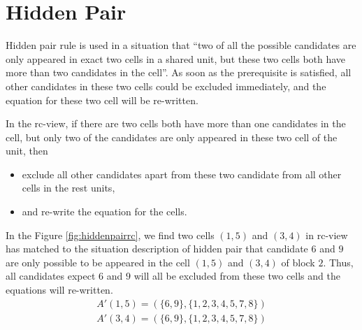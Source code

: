 \documentclass[11pt]{report}
\newcommand{\set}[1]{\{ #1 \}}
\begin{document}
\section{Hidden Pair}
\label{sec:Hidden Pair}

Hidden pair rule is used in a situation that ``two of all the possible candidates are only appeared in exact two cells in a shared unit, but these two cells both have more than two candidates in the cell''. As soon as the prerequisite is satisfied, all other candidates in these two cells could be excluded immediately, and the equation for these two cell will be re-written. 

In the rc-view, if there are two cells both have more than one candidates in the cell, but only two of the candidates are only appeared in these two cell of the unit, then
\begin{itemize}
\item exclude all other candidates apart from these two candidate from all other cells in the rest units,
\item and re-write the equation for the cells.
\end{itemize}
In the Figure \ref{fig:hiddenpairrc}, we find two cells $(1,5)$ and $(3,4)$ in rc-view has matched to the situation description of hidden pair that candidate $6$ and $9$ are only possible to be appeared in the cell $(1,5)$ and $(3,4)$ of block $2$. Thus, all candidates expect $6$ and $9$ will all be excluded from these two cells and the equations will re-written.
\begin{eqnarray*}
A'(1,5) = (\set{6, 9}, \set{1, 2, 3, 4, 5, 7, 8})\\
A'(3,4) = (\set{6, 9}, \set{1, 2, 3, 4, 5, 7, 8})\\
\end{eqnarray*}
\end{document}
